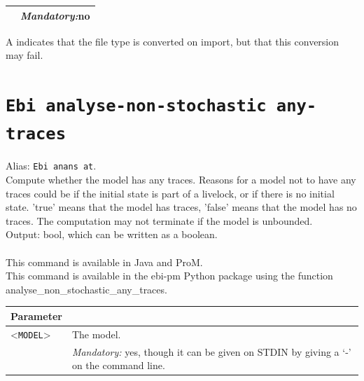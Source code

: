 {\begin{tabularx}{\linewidth}{lX}
&\textit{Mandatory:}\quad no\\
\bottomrule
\end{tabularx}
A \textdagger{} indicates that the file type is converted on import, but that this conversion may fail.
\clearpage\section{\texttt{Ebi analyse-non-stochastic any-traces}}
\label{command:Ebi analyse-non-stochastic any-traces}
Alias: \texttt{Ebi anans at}.\\
Compute whether the model has any traces.
        Reasons for a model not to have any traces could be if the initial state is part of a livelock, or if there is no initial state.
        'true' means that the model has traces, 'false' means that the model has no traces.
        The computation may not terminate if the model is unbounded.\\
\noindent Output: bool, which can be written as a boolean.\\
\\This command is available in Java and ProM.
\\This command is available in the ebi-pm Python package using the function analyse\_non\_stochastic\_any\_traces.
\begin{tabularx}{\linewidth}{lX}
\toprule
Parameter \\\midrule
<\texttt{MODEL}>&The model.\\
&\textit{Mandatory:} \quad yes, though it can be given on STDIN by giving a `-' on the command line.\\

\end{tabularx}}

